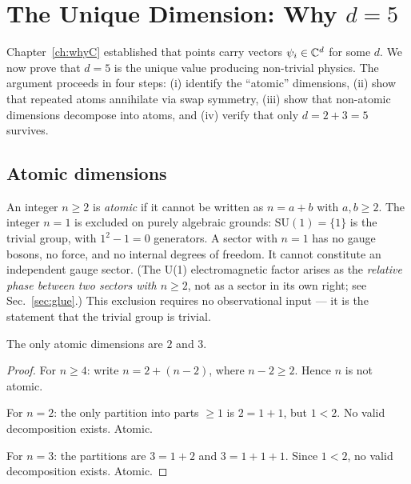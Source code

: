 \section{The Unique Dimension: Why $d = 5$}
\label{ch:whyd5}

Chapter~\ref{ch:whyC} established that points carry vectors $\psi_i \in \mathbb{C}^d$ for some $d$. We now prove that $d = 5$ is the unique value producing non-trivial physics. The argument proceeds in four steps: (i) identify the ``atomic'' dimensions, (ii) show that repeated atoms annihilate via swap symmetry, (iii) show that non-atomic dimensions decompose into atoms, and (iv) verify that only $d = 2 + 3 = 5$ survives.

\subsection{Atomic dimensions}

\begin{definition}
An integer $n \geq 2$ is \emph{atomic} if it cannot be written as $n = a + b$ with $a, b \geq 2$. The integer $n = 1$ is excluded on purely algebraic grounds: $\text{SU}(1) = \{1\}$ is the trivial group, with $1^2 - 1 = 0$ generators. A sector with $n = 1$ has no gauge bosons, no force, and no internal degrees of freedom. It cannot constitute an independent gauge sector. (The U(1) electromagnetic factor arises as the \emph{relative phase between two sectors with $n \geq 2$}, not as a sector in its own right; see Sec.~\ref{sec:glue}.) This exclusion requires no observational input --- it is the statement that the trivial group is trivial.
\end{definition}

\begin{lemma}
\label{lem:atoms}
The only atomic dimensions are $2$ and $3$.
\end{lemma}

\begin{proof}
For $n \geq 4$: write $n = 2 + (n - 2)$, where $n - 2 \geq 2$. Hence $n$ is not atomic.

For $n = 2$: the only partition into parts $\geq 1$ is $2 = 1 + 1$, but $1 < 2$. No valid decomposition exists. Atomic.

For $n = 3$: the partitions are $3 = 1 + 2$ and $3 = 1 + 1 + 1$. Since $1 < 2$, no valid decomposition exists. Atomic.
\end{proof}

